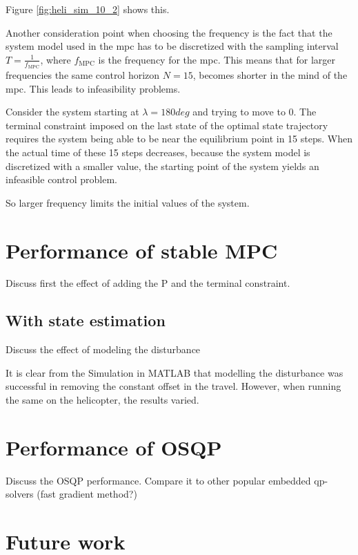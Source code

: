 Figure \ref{fig:heli_sim_10_2} shows this. 

Another consideration point when choosing the frequency is the fact that the system model used in the \acrshort{mpc} has to be discretized with the sampling interval $T = \frac{1}{f_{\text{MPC}}}$, where $f_{\text{MPC}}$ is the frequency for the \acrshort{mpc}. This means that for larger frequencies the same control horizon $N = 15$, becomes shorter in the mind of the \acrshort{mpc}. This leads to infeasibility problems.

Consider the system starting at $\lambda = 180 deg$ and trying to move to $0$. The terminal constraint imposed on the last state of the optimal state trajectory requires the system being able to be near the equilibrium point in 15 steps. When the actual time of these 15 steps decreases, because the system model is discretized with a smaller value, the starting point of the system yields an infeasible control problem. 

So larger frequency limits the initial values of the system. 

\section{Performance of stable MPC}
Discuss first the effect of adding the P and the terminal constraint.

\subsection{With state estimation}
Discuss the effect of modeling the disturbance

It is clear from the Simulation in MATLAB that modelling the disturbance was successful in removing the constant offset in the travel. However, when running the same on the helicopter, the results varied.



\section{Performance of OSQP}

Discuss the OSQP performance. Compare it to other popular embedded \acrshort{qp}-solvers (fast gradient method?)

\section{Future work}

